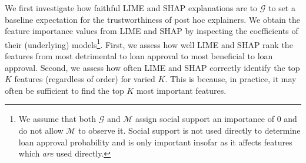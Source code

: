 \documentclass[11pt]{article}    %
\begin{document}
We first investigate how faithful LIME and SHAP explanations are to $\mathcal{G}$ to set a baseline expectation for the trustworthiness of post hoc explainers. We obtain the feature importance values from LIME and SHAP  by inspecting the coefficients of their (underlying) models\footnote{We assume that both $\mathcal{G}$ and $\mathcal{M}$ assign social support an importance of 0 and do not allow $\mathcal{M}$ to observe it. Social support is not used directly to determine loan approval probability and is only important insofar as it affects features which \emph{are} used directly.}.  First, we assess how well LIME and SHAP rank the features from most detrimental to loan approval to most beneficial to loan approval. Second, we assess how often LIME and SHAP correctly identify the top $K$ features (regardless of order) for varied $K$. This is because, in practice, it may often be sufficient to find the top $K$ most important features. %

                     
\end{document}
